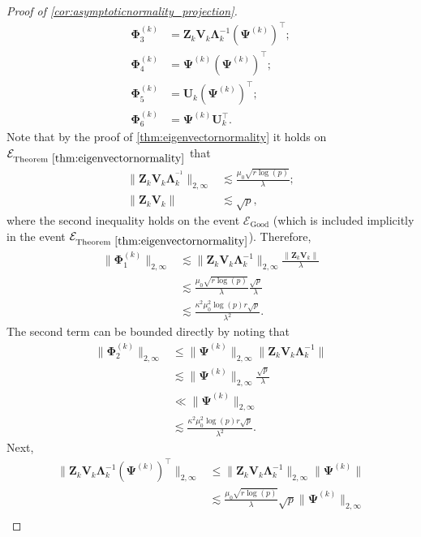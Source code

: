 \documentclass[10pt]{article}
\newcommand{\0}{{\mathbf{0}}}
\newcommand{\1}{{\mathbf{1}}}
\newcommand{\U}{{\mathbf{U}}}
\renewcommand{\t}{^{\top}}
\newcommand{\inv}{^{-1}}
\begin{document}
\begin{proof}[Proof of \cref{cor:asymptoticnormality_projection}]
\begin{align*}
     \mathbf{\Phi}^{(k)}_3 &= \mathbf{Z}_k \mathbf{V}_k \mathbf{\Lambda}_k^{-1}(\mathbf{\Psi}^{(k)})\t; \\
      \mathbf{\Phi}^{(k)}_4 &= \mathbf{\Psi}^{(k)} (\mathbf{\Psi}^{(k)})\t; \\
       \mathbf{\Phi}^{(k)}_5 &= \U_k (\mathbf{\Psi}^{(k)})\t; \\
       \mathbf{\Phi}^{(k)}_6 &= \mathbf{\Psi}^{(k)} \U_k\t.
\end{align*}
Note that by the proof of \cref{thm:eigenvectornormality} it holds on $\mathcal{E}_{\mathrm{Theorem} \ \ref{thm:eigenvectornormality}}$ that
\begin{align*}
    \| \mathbf{Z}_k \mathbf{V}_k \mathbf{\Lambda}_k^{\inv} \|_{2,\infty} &\lesssim \frac{\mu_0 \sqrt{r\log(p)}}{\lambda}; \\
    \| \mathbf{Z}_k \mathbf{V}_k \| &\lesssim \sqrt{p},
\end{align*}
where the second inequality holds on the event $\mathcal{E}_{\mathrm{Good}}$  (which is included implicitly in the event $\mathcal{E}_{\mathrm{Theorem} \ \ref{thm:eigenvectornormality}}$).  Therefore,
\begin{align*}
    \| \mathbf{\Phi}_1^{(k)} \|_{2,\infty} &\lesssim \| \mathbf{Z}_k \mathbf{V}_k \mathbf{\Lambda}_k\inv \|_{2,\infty} \frac{ \| \mathbf{Z}_k \mathbf{V}_k \|}{\lambda} \\
    &\lesssim \frac{\mu_0 \sqrt{r\log(p)}}{\lambda} \frac{\sqrt{p}}{\lambda} \\
    &\lesssim \frac{\kappa^2 \mu_0^2 \log(p) r \sqrt{p}}{\lambda^2}.
\end{align*}
The second term can be bounded directly by noting that
\begin{align*}
    \| \mathbf{\Phi}_2^{(k)} \|_{2,\infty} &\leq \| \mathbf{\Psi}^{(k)} \|_{2,\infty} \| \mathbf{Z}_k \mathbf{V}_k \mathbf{\Lambda}_k\inv \| \\
    &\lesssim \| \mathbf{\Psi}^{(k)} \|_{2,\infty} \frac{\sqrt{p}}{\lambda} \\
    &\ll \| \mathbf{\Psi}^{(k)} \|_{2,\infty} \\
    &\lesssim \frac{\kappa^2 \mu_0^2 \log(p) r \sqrt{p}}{\lambda^2}.
\end{align*}
Next,
\begin{align*}
    \| \mathbf{Z}_k \mathbf{V}_k \mathbf{\Lambda}_k\inv  (\mathbf{\Psi}^{(k)})\t \|_{2,\infty} &\leq   \| \mathbf{Z}_k \mathbf{V}_k \mathbf{\Lambda}_k\inv \|_{2,\infty} \| \mathbf{\Psi}^{(k)} \| \\
    &\lesssim \frac{\mu_0 \sqrt{r\log(p)}}{\lambda} \sqrt{p} \| \mathbf{\Psi}^{(k)} \|_{2,\infty} \\

\end{align*}
\end{proof}
\end{document}
